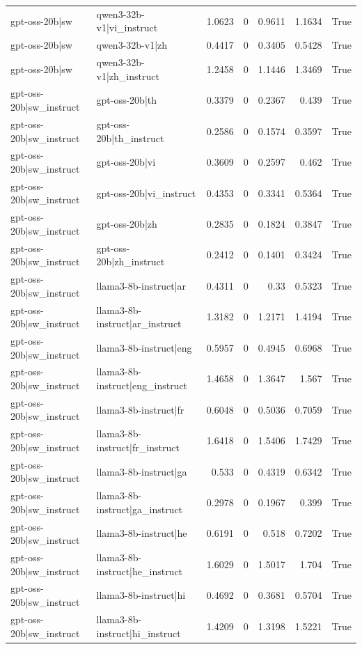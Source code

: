 \begin{table}
\begin{tabular}{l l r r r r l}
gpt-oss-20b|sw & qwen3-32b-v1|vi_instruct & 1.0623 & 0 & 0.9611 & 1.1634 & True \\
gpt-oss-20b|sw & qwen3-32b-v1|zh & 0.4417 & 0 & 0.3405 & 0.5428 & True \\
gpt-oss-20b|sw & qwen3-32b-v1|zh_instruct & 1.2458 & 0 & 1.1446 & 1.3469 & True \\
gpt-oss-20b|sw_instruct & gpt-oss-20b|th & 0.3379 & 0 & 0.2367 & 0.439 & True \\
gpt-oss-20b|sw_instruct & gpt-oss-20b|th_instruct & 0.2586 & 0 & 0.1574 & 0.3597 & True \\
gpt-oss-20b|sw_instruct & gpt-oss-20b|vi & 0.3609 & 0 & 0.2597 & 0.462 & True \\
gpt-oss-20b|sw_instruct & gpt-oss-20b|vi_instruct & 0.4353 & 0 & 0.3341 & 0.5364 & True \\
gpt-oss-20b|sw_instruct & gpt-oss-20b|zh & 0.2835 & 0 & 0.1824 & 0.3847 & True \\
gpt-oss-20b|sw_instruct & gpt-oss-20b|zh_instruct & 0.2412 & 0 & 0.1401 & 0.3424 & True \\
gpt-oss-20b|sw_instruct & llama3-8b-instruct|ar & 0.4311 & 0 & 0.33 & 0.5323 & True \\
gpt-oss-20b|sw_instruct & llama3-8b-instruct|ar_instruct & 1.3182 & 0 & 1.2171 & 1.4194 & True \\
gpt-oss-20b|sw_instruct & llama3-8b-instruct|eng & 0.5957 & 0 & 0.4945 & 0.6968 & True \\
gpt-oss-20b|sw_instruct & llama3-8b-instruct|eng_instruct & 1.4658 & 0 & 1.3647 & 1.567 & True \\
gpt-oss-20b|sw_instruct & llama3-8b-instruct|fr & 0.6048 & 0 & 0.5036 & 0.7059 & True \\
gpt-oss-20b|sw_instruct & llama3-8b-instruct|fr_instruct & 1.6418 & 0 & 1.5406 & 1.7429 & True \\
gpt-oss-20b|sw_instruct & llama3-8b-instruct|ga & 0.533 & 0 & 0.4319 & 0.6342 & True \\
gpt-oss-20b|sw_instruct & llama3-8b-instruct|ga_instruct & 0.2978 & 0 & 0.1967 & 0.399 & True \\
gpt-oss-20b|sw_instruct & llama3-8b-instruct|he & 0.6191 & 0 & 0.518 & 0.7202 & True \\
gpt-oss-20b|sw_instruct & llama3-8b-instruct|he_instruct & 1.6029 & 0 & 1.5017 & 1.704 & True \\
gpt-oss-20b|sw_instruct & llama3-8b-instruct|hi & 0.4692 & 0 & 0.3681 & 0.5704 & True \\
gpt-oss-20b|sw_instruct & llama3-8b-instruct|hi_instruct & 1.4209 & 0 & 1.3198 & 1.5221 & True \\

\end{tabular}
\end{table}
